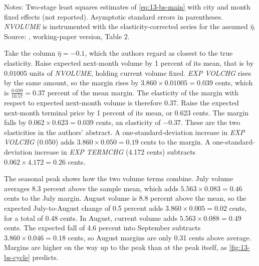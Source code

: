 \begin{table}[htbp]
\smallskip
\begin{minipage}{0.92\textwidth}\footnotesize
Notes: Two-stage least squares estimates of \eqref{eq:13-bs-main} with city and month fixed effects (not
reported). Asymptotic standard errors in parentheses. \textit{NVOLUME} is instrumented with the
elasticity-corrected series for the assumed $\hat\eta$. Source: \citet{BorensteinShepard1996}, working-paper
version, Table 2.
\end{minipage}
\end{table}

\begin{example}\label{ex:13-bs-elasticity}
Take the column $\hat\eta=-0.1$, which the authors regard as closest to the true elasticity. Raise expected
next-month volume by 1 percent of its mean, that is by $0.01005$ units of \textit{NVOLUME}, holding current
volume fixed. \textit{EXP VOLCHG} rises by the same amount, so the margin rises by $3.860\times0.01005=0.039$
cents, which is $\frac{0.039}{10.57}=0.37$ percent of the mean margin. The elasticity of the margin with respect
to expected next-month volume is therefore 0.37. Raise the expected next-month terminal price by 1 percent of its
mean, or 0.623 cents. The margin falls by $0.062\times0.623=0.039$ cents, an elasticity of $-0.37$. These are the
two elasticities in the authors' abstract. A one-standard-deviation increase in \textit{EXP VOLCHG} (0.050) adds
$3.860\times0.050=0.19$ cents to the margin. A one-standard-deviation increase in \textit{EXP TERMCHG} (4.172
cents) subtracts $0.062\times4.172=0.26$ cents.

The seasonal peak shows how the two volume terms combine. July volume averages 8.3 percent above the sample
mean, which adds $5.563\times0.083=0.46$ cents to the July margin. August volume is 8.8 percent above the mean,
so the expected July-to-August change of 0.5 percent adds $3.860\times0.005=0.02$ cents, for a total of 0.48 cents.
In August, current volume adds $5.563\times0.088=0.49$ cents. The expected fall of 4.6 percent into September
subtracts $3.860\times0.046=0.18$ cents, so August margins are only 0.31 cents above average. Margins are higher
on the way up to the peak than at the peak itself, as \cref{fig:13-bs-cycle} predicts.
\end{example}

